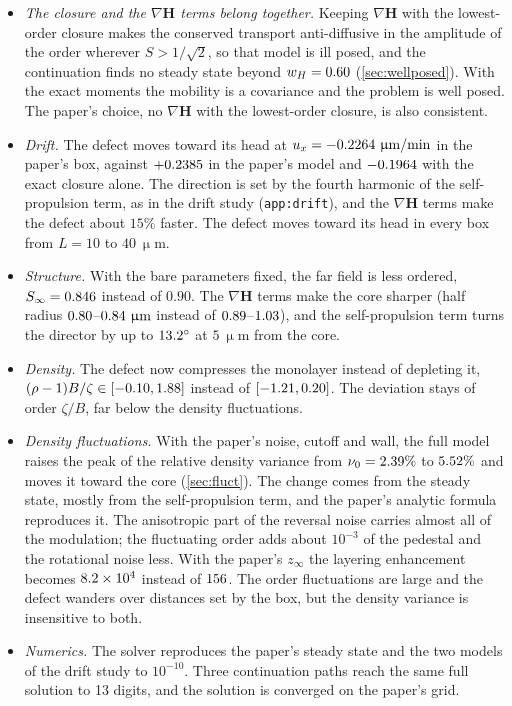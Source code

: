 \documentclass[11pt,a4paper]{article}
\newcommand{\upd}[1]{{\color{OliveGreen}#1}}
\renewcommand{\H}{\mathbf{H}}
\newcommand{\micron}{\upmu\mathrm{m}}
\newcommand{\minute}{\mathrm{min}}
\begin{document}
\begin{itemize}
  \item \emph{The closure and the $\nabla\H$ terms belong together.} Keeping $\nabla\H$ with
    the lowest-order closure makes the conserved transport anti-diffusive in the amplitude of
    the order wherever $S>1/\sqrt2$, so that model is ill posed, and the continuation finds no
    steady state beyond $w_H=0.60$ (\cref{sec:wellposed}). With the exact moments the mobility is a covariance and
    the problem is well posed. The paper's choice, no $\nabla\H$ with the lowest-order
    closure, is also consistent.
  \item \emph{Drift.} The defect moves toward its head at
    $u_x=\numuAOneFull~\micron/\minute$ in the paper's box, against $+0.2385$ in the
    paper's model and $-0.1964$ with the exact closure alone. The direction is set by
    the fourth harmonic of the self-propulsion term, as in the drift study (\texttt{app:drift}), and \upd{the $\nabla\H$ terms}
    \upd{make} the defect about $15\%$ faster. The defect moves toward its head in every box from
    $L=10$ to $40~\micron$.
  \item \emph{Structure.} With the bare parameters fixed, the far field is less ordered,
    $S_\infty=0.846$ instead of $0.90$. \upd{The $\nabla\H$ terms make} the core sharper
    (half radius $0.80$--$\numrhalfHeadFull~\micron$ instead of
    $0.89$--$1.03$), and the self-propulsion term turns the
    director by up to $13.2^\circ$ at $5~\micron$ from the core.
  \item \emph{Density.} The defect now compresses the monolayer instead of depleting it,
    $(\rho-1)B/\zeta\in[-0.10,1.88]$ instead of
    $[-1.21,0.20]$. The deviation stays of order $\zeta/B$, far below the
    density fluctuations.
  \item \emph{Density fluctuations.} With the paper's noise, cutoff and wall, the full model
    raises the peak of the relative density variance from $\nu_0=2.39\%$ to
    $5.52\%$ and moves it toward the core (\cref{sec:fluct}). The change comes from the
    steady state, mostly from the self-propulsion term, and the paper's analytic formula
    reproduces it. The anisotropic part of the reversal noise carries almost all of the
    modulation; the fluctuating order adds about $10^{-3}$ of the pedestal and the rotational
    noise less. With the paper's $z_\infty$ the layering enhancement becomes $8.2\times10^{4}$ instead of
    $156$. The order fluctuations are large and the defect wanders over distances set by
    the box, but the density variance is insensitive to both.
  \item \emph{Numerics.} The solver reproduces the paper's steady state and the two models
    of the drift study to $10^{-10}$. Three continuation paths reach the same full solution
    to 13 digits, and the solution is converged on the paper's grid.
\end{itemize}
\end{document}
